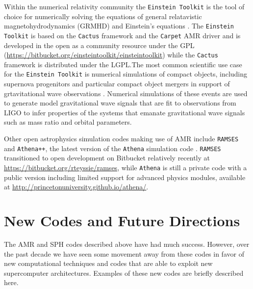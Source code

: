 \documentclass[11pt,twoside]{article}
\begin{document}
Within the numerical relativity community the \texttt{Einstein Toolkit} is the tool of choice for numerically solving the equations of general relatavistic magnetohydrodynamics (GRMHD) and Einstein's equations \citep{loffler2012}. The \texttt{Einstein Toolkit} is based on the \texttt{Cactus} framework and the \texttt{Carpet} AMR driver and is developed in the open as a community resource under the GPL \citep{loffler2013} ({\small \url{https://bitbucket.org/einsteintoolkit/einsteintoolkit}}) while the \texttt{Cactus} framework is distributed under the LGPL.\@  The most common scientific use case for the \texttt{Einstein Toolkit} is numerical simulations of compact objects, including supernova progenitors \citep{mosta2014} and particular compact object mergers in support of grtavitational wave observations \citep{ajith2012}. Numerical simulations of these events are used to generate model gravitational wave signals that are fit to observations from LIGO to infer properties of the systems that emanate gravitational wave signals such as mass ratio and orbital parameters.

Other open astrophysics simulation codes making use of AMR include \texttt{RAMSES} \citep{teyssier2002} and \texttt{Athena++}, the latest version of the \texttt{Athena} simulation code \citep{stone2008}. \texttt{RAMSES} transitioned to open development on Bitbucket relatively recently at \url{https://bitbucket.org/rteyssie/ramses}, while \texttt{Athena} is still a private code with a public version including limited support for advanced physics modules, available at \url{http://princetonuniversity.github.io/athena/}.

\section{New Codes and Future Directions}
\label{usm}

The AMR and SPH codes described above have had much success. However, over the past decade we have seen some movement away from these codes in favor of new computational techniques and codes that are able to exploit new supercomputer architectures. Examples of these new codes are briefly described here.
\end{document}
